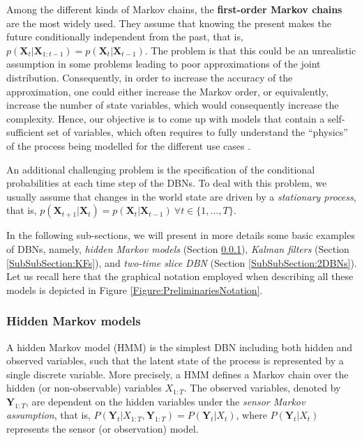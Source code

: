 Among the different kinds of Markov chains, the \textbf{first-order Markov chains} are the most widely used. They assume that knowing the present makes the future conditionally independent from the past, that is, $p(\bm X_t| \bm X_{1:t-1})  = p(\bm X_t|\bm X_{t-1})$. The problem is that this could be an unrealistic assumption in some problems leading to poor approximations of the joint distribution. Consequently, in order to increase the accuracy of the approximation, one could either increase the Markov order, or equivalently, increase the number of state variables, which would consequently increase the complexity. Hence, our objective is to come up with models that contain a self-sufficient set of variables, which often requires to fully understand the ``physics''  of the process being modelled for the different use cases \cite{russelNorvig2009}. 

An additional challenging problem is the specification of the conditional probabilities at each time step of the DBNs. To deal with this problem, we usually assume that changes in the world state are driven by a \textit{stationary process}, that is, $p(\bm X_{t+1}|\bm X_{t}) = p(\bm X_t|\bm X_{t-1})\ \forall t \in\{1,\ldots,T\}$. 

In the following sub-sections, we will present in more details some basic examples of DBNs, namely, \textit{hidden Markov models} (Section \ref{SubSubSection:HMMs}), \textit{Kalman filters} (Section \ref{SubSubSection:KFs}), and \textit{two-time slice DBN} (Section \ref{SubSubSection:2DBNs}). Let us recall here that the graphical notation employed when describing all these models is depicted in Figure \ref{Figure:PreliminariesNotation}.

\subsubsection{Hidden Markov models}\label{SubSubSection:HMMs}

A hidden Markov model (HMM) is the simplest DBN including both hidden and observed variables, such that the latent state of the process is represented by a single discrete variable. More precisely, a HMM defines a Markov chain over the hidden (or non-observable) variables $X_{1:T}$. The observed variables, denoted by $\bm Y_{1:T}$, are dependent on the hidden variables under the \textit{sensor Markov assumption}, that is, $P(\bm Y_t| X_{1:T}, \bm Y_{1:T}) = P(\bm Y_t| X_t)$, where $P(\bm Y_t| X_t)$ represents the sensor (or observation) model.  

